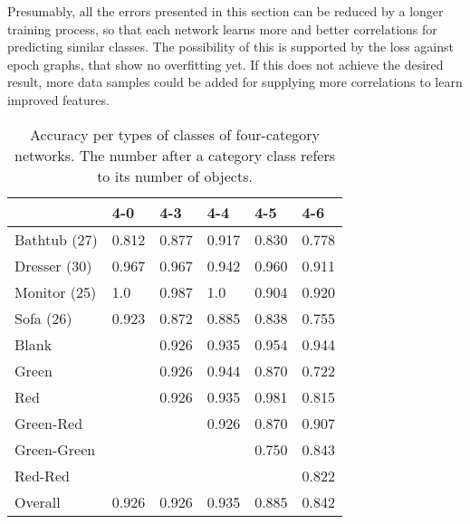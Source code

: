 Presumably, all the errors presented in this section can be reduced by a longer training process, so that each network learns more and better correlations for predicting similar classes.
The possibility of this is supported by the loss against epoch graphs, that show no overfitting yet.
If this does not achieve the desired result, more data samples could be added for supplying more correlations to learn improved features.
\begin{table}[]
	\centering
	\caption[Accuracy per types of classes of four-category networks]{Accuracy per types of classes of four-category networks. The number after a category class refers to its number of objects.}
	\label{tab:four-category-accuracies}
	\begin{tabular}{l|lllll}
		            & 4-0   & 4-3   & 4-4   & 4-5   & 4-6   \\ \hline
		Bathtub (27)& 0.812 & 0.877 & 0.917 & 0.830 & 0.778 \\
		Dresser (30)& 0.967 & 0.967 & 0.942 & 0.960 & 0.911 \\
		Monitor (25)& 1.0   & 0.987 & 1.0   & 0.904 & 0.920 \\
		Sofa (26)   & 0.923 & 0.872 & 0.885 & 0.838 & 0.755 \\ \hline
		Blank       &       & 0.926 & 0.935 & 0.954 & 0.944 \\
		Green       &       & 0.926 & 0.944 & 0.870 & 0.722 \\
		Red         &       & 0.926 & 0.935 & 0.981 & 0.815 \\
		Green-Red   &       &       & 0.926 & 0.870 & 0.907 \\
		Green-Green &       &       &       & 0.750 & 0.843 \\
		Red-Red     &       &       &       &       & 0.822 \\ \hline
		Overall     & 0.926 & 0.926 & 0.935 & 0.885 & 0.842
	\end{tabular}
\end{table}